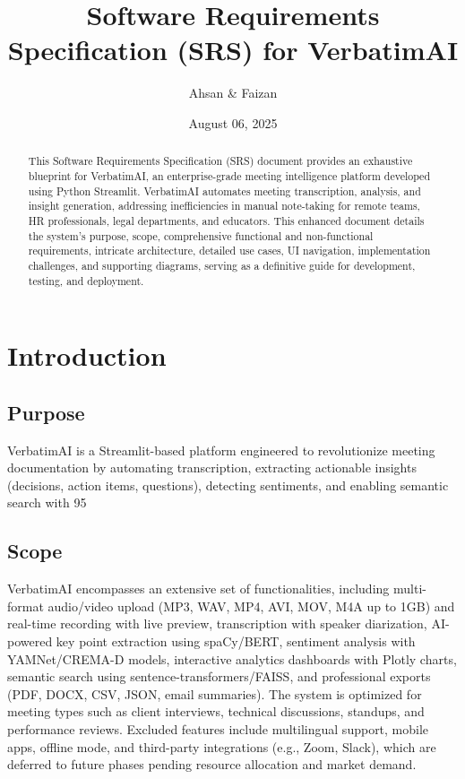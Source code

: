 \documentclass[12pt]{article}
\title{Software Requirements Specification (SRS) for VerbatimAI}
\author{Ahsan \& Faizan}
\date{August 06, 2025}
\begin{document}
\maketitle

\begin{abstract}
This Software Requirements Specification (SRS) document provides an exhaustive blueprint for VerbatimAI, an enterprise-grade meeting intelligence platform developed using Python Streamlit. VerbatimAI automates meeting transcription, analysis, and insight generation, addressing inefficiencies in manual note-taking for remote teams, HR professionals, legal departments, and educators. This enhanced document details the system's purpose, scope, comprehensive functional and non-functional requirements, intricate architecture, detailed use cases, UI navigation, implementation challenges, and supporting diagrams, serving as a definitive guide for development, testing, and deployment.
\end{abstract}

\tableofcontents
\newpage

\section{Introduction}
\subsection{Purpose}
VerbatimAI is a Streamlit-based platform engineered to revolutionize meeting documentation by automating transcription, extracting actionable insights (decisions, action items, questions), detecting sentiments, and enabling semantic search with 95%

\subsection{Scope}
VerbatimAI encompasses an extensive set of functionalities, including multi-format audio/video upload (MP3, WAV, MP4, AVI, MOV, M4A up to 1GB) and real-time recording with live preview, transcription with speaker diarization, AI-powered key point extraction using spaCy/BERT, sentiment analysis with YAMNet/CREMA-D models, interactive analytics dashboards with Plotly charts, semantic search using sentence-transformers/FAISS, and professional exports (PDF, DOCX, CSV, JSON, email summaries). The system is optimized for meeting types such as client interviews, technical discussions, standups, and performance reviews. Excluded features include multilingual support, mobile apps, offline mode, and third-party integrations (e.g., Zoom, Slack), which are deferred to future phases pending resource allocation and market demand.
\end{document}
